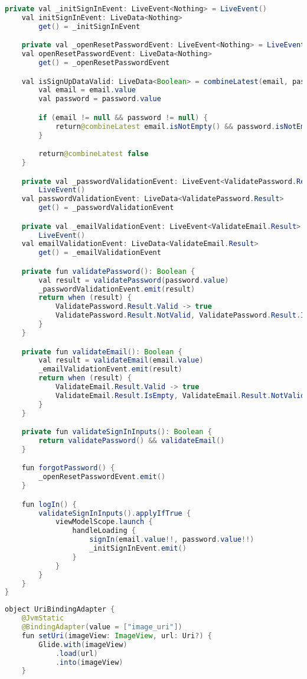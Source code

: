 \begin{asection}
\begin{lstlisting}[language=Java,label={lst:add:a_7}, caption={GestureDetectorCompat}]
    private val _initSignInEvent: LiveEvent<Nothing> = LiveEvent()
    val initSignInEvent: LiveData<Nothing>
        get() = _initSignInEvent

    private val _openResetPasswordEvent: LiveEvent<Nothing> = LiveEvent()
    val openResetPasswordEvent: LiveData<Nothing>
        get() = _openResetPasswordEvent

    val isSignUpDataValid: LiveData<Boolean> = combineLatest(email, password) {
        val email = email.value
        val password = password.value

        if (email != null && password != null) {
            return@combineLatest email.isNotEmpty() && password.isNotEmpty()
        }

        return@combineLatest false
    }

    private val _passwordValidationEvent: LiveEvent<ValidatePassword.Result> =
        LiveEvent()
    val passwordValidationEvent: LiveData<ValidatePassword.Result>
        get() = _passwordValidationEvent

    private val _emailValidationEvent: LiveEvent<ValidateEmail.Result> =
        LiveEvent()
    val emailValidationEvent: LiveData<ValidateEmail.Result>
        get() = _emailValidationEvent

    private fun validatePassword(): Boolean {
        val result = validatePassword(password.value)
        _passwordValidationEvent.emit(result)
        return when (result) {
            ValidatePassword.Result.Valid -> true
            ValidatePassword.Result.NotValid, ValidatePassword.Result.IsEmpty -> false
        }
    }

    private fun validateEmail(): Boolean {
        val result = validateEmail(email.value)
        _emailValidationEvent.emit(result)
        return when (result) {
            ValidateEmail.Result.Valid -> true
            ValidateEmail.Result.IsEmpty, ValidateEmail.Result.NotValid -> false
        }
    }

    private fun validateSignInInputs(): Boolean {
        return validatePassword() && validateEmail()
    }

    fun forgotPassword() {
        _openResetPasswordEvent.emit()
    }

    fun logIn() {
        validateSignInInputs().applyIfTrue {
            viewModelScope.launch {
                handleLoading {
                    signIn(email.value!!, password.value!!)
                    _initSignInEvent.emit()
                }
            }
        }
    }
}
\end{lstlisting}
\hfill \break
\begin{lstlisting}[language=Java,label={lst:add:a_8}, caption={UriBindingAdapter}]
object UriBindingAdapter {
    @JvmStatic
    @BindingAdapter(value = ["image_uri"])
    fun setUri(imageView: ImageView, url: Uri?) {
        Glide.with(imageView)
            .load(url)
            .into(imageView)
    }


\end{lstlisting}
\end{asection}
